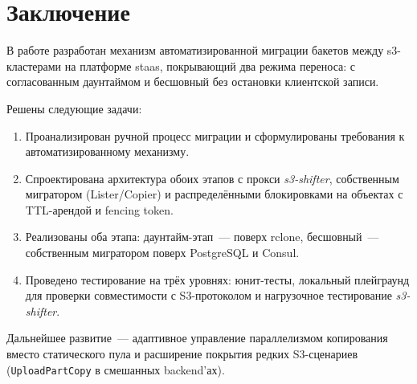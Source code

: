 \section*{Заключение}

В работе разработан механизм автоматизированной миграции бакетов между \gls{s3}-кластерами на платформе \gls{staas}, покрывающий два режима переноса: с согласованным даунтаймом и бесшовный без остановки клиентской записи.

Решены следующие задачи:
\begin{enumerate}
    \item Проанализирован ручной процесс миграции и сформулированы требования к автоматизированному механизму.
    \item Спроектирована архитектура обоих этапов с прокси \textit{s3-shifter}, собственным мигратором (Lister/Copier) и распределёнными блокировками на объектах с TTL-арендой и fencing token.
    \item Реализованы оба этапа: даунтайм-этап~--- поверх \gls{rclone}, бесшовный~--- собственным мигратором поверх PostgreSQL и Consul.
    \item Проведено тестирование на трёх уровнях: юнит-тесты, локальный плейграунд для проверки совместимости с S3-протоколом и нагрузочное тестирование \textit{s3-shifter}.
\end{enumerate}

Дальнейшее развитие~--- адаптивное управление параллелизмом копирования вместо статического пула и расширение покрытия редких S3-сценариев (\texttt{UploadPartCopy} в смешанных backend'ах).
